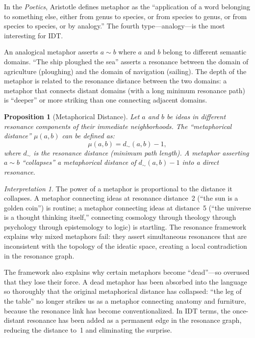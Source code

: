 \documentclass[11pt,openany]{book}
\theoremstyle{definition}
\theoremstyle{plain}
\newtheorem{proposition}[axiom]{Proposition}
\theoremstyle{remark}
\newtheorem{interpretation}[axiom]{Interpretation}
\newcommand{\res}{\sim}                      %
\begin{document}
In the \textit{Poetics}, Aristotle defines metaphor as the ``application of a word belonging to something else, either from genus to species, or from species to genus, or from species to species, or by analogy.'' The fourth type---analogy---is the most interesting for IDT.

An analogical metaphor asserts $a \res b$ where $a$ and $b$ belong to different semantic domains. ``The ship ploughed the sea'' asserts a resonance between the domain of agriculture (ploughing) and the domain of navigation (sailing). The depth of the metaphor is related to the resonance distance between the two domains: a metaphor that connects distant domains (with a long minimum resonance path) is ``deeper'' or more striking than one connecting adjacent domains.

\begin{proposition}[Metaphorical Distance]
Let $a$ and $b$ be ideas in different resonance components of their immediate neighborhoods. The ``metaphorical distance'' $\mu(a, b)$ can be defined as:
\[
\mu(a, b) = d_\res(a, b) - 1,
\]
where $d_\res$ is the resonance distance (minimum path length). A metaphor asserting $a \res b$ ``collapses'' a metaphorical distance of $d_\res(a, b) - 1$ into a direct resonance.
\end{proposition}

\begin{interpretation}
The power of a metaphor is proportional to the distance it collapses. A metaphor connecting ideas at resonance distance~2 (``the sun is a golden coin'') is routine; a metaphor connecting ideas at distance~5 (``the universe is a thought thinking itself,'' connecting cosmology through theology through psychology through epistemology to logic) is startling. The resonance framework explains why mixed metaphors fail: they assert simultaneous resonances that are inconsistent with the topology of the ideatic space, creating a local contradiction in the resonance graph.

The framework also explains why certain metaphors become ``dead''---so overused that they lose their force. A dead metaphor has been absorbed into the language so thoroughly that the original metaphorical distance has collapsed: ``the leg of the table'' no longer strikes us as a metaphor connecting anatomy and furniture, because the resonance link has become conventionalized. In IDT terms, the once-distant resonance has been added as a permanent edge in the resonance graph, reducing the distance to~1 and eliminating the surprise.
\end{interpretation}
\end{document}
